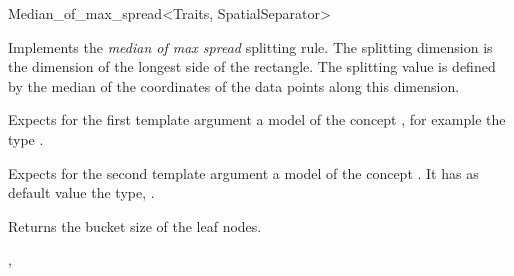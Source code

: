 

\begin{ccRefFunctionObjectClass}{Median_of_max_spread<Traits, SpatialSeparator>}

\ccDefinition
Implements the {\em median of max spread} splitting rule.
The splitting dimension is the dimension of the longest side of the rectangle.
The splitting value is defined by the median of the coordinates of the data points
along this dimension.


\ccParameters

Expects for the first template argument a model of
the concept , for example
the type . 

Expects for the second template argument a model of the concept . It has as default value
the type, .



\ccIsModel



\ccCreation
{}  %


\ccOperations
{} {Returns the bucket size of the leaf nodes.}


\ccSeeAlso

,\\


\end{ccRefFunctionObjectClass}


